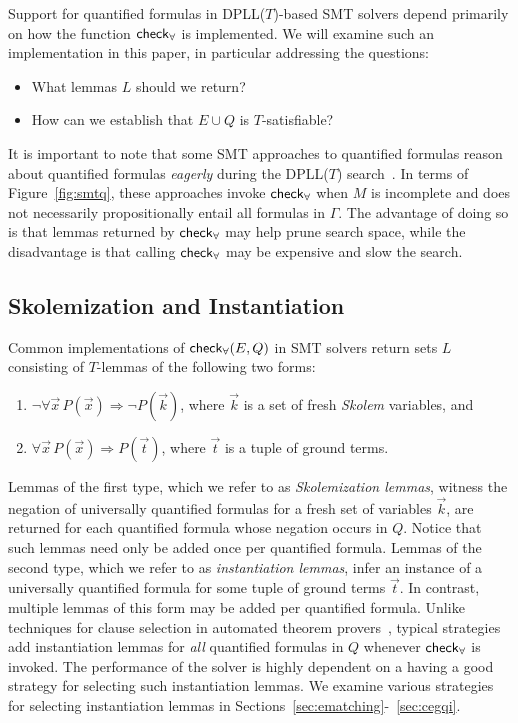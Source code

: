 \documentclass[oribibl]{llncs}
\begin{document}
Support for quantified formulas in DPLL($T$)-based SMT solvers depend primarily on how the function $\small\mathsf{check}_\forall$ is implemented.
We will examine such an implementation in this paper, in particular addressing the questions:
\begin{itemize}
\item What lemmas $L$ should we return?
\item How can we establish that $E \cup Q$ is $T$-satisfiable?
\end{itemize}

It is important to note that some SMT approaches to quantified formulas
reason about quantified formulas \emph{eagerly} during the DPLL($T$) search~\cite{MouraBjoerner07}.
In terms of Figure~\ref{fig:smtq}, these approaches invoke $\small\mathsf{check}_\forall$
when $M$ is incomplete and does not necessarily propositionally entail all formulas in $\Gamma$.
The advantage of doing so is that lemmas returned by $\small\mathsf{check}_\forall$ may help prune search space,
while the disadvantage is that calling $\small\mathsf{check}_\forall$ may be expensive and slow the search.

\subsection{Skolemization and Instantiation}
Common implementations of $\small\mathsf{check}_\forall( E, Q )$ in SMT solvers return sets $L$ consisting of $T$-lemmas of the following two forms:
\begin{enumerate}
\item $\neg \forall \vec x\, P( \vec x ) \Rightarrow \neg P( \vec k )$, where $\vec k$ is a set of fresh \emph{Skolem} variables, and
\item $\forall \vec x\, P( \vec x ) \Rightarrow P( \vec t )$, where $\vec t$ is a tuple of ground terms.
\end{enumerate}
Lemmas of the first type, which we refer to as \emph{Skolemization lemmas},
witness the negation of universally quantified formulas for a fresh set of variables $\vec{k}$,
are returned for each quantified formula whose negation occurs in $Q$.
Notice that such lemmas need only be added once per quantified formula.
Lemmas of the second type, which we refer to as \emph{instantiation lemmas},
infer an instance of a universally quantified formula for some tuple of ground terms $\vec{ t }$.
In contrast, multiple lemmas of this form may be added per quantified formula.
Unlike techniques for clause selection in automated theorem provers~\cite{DBLP:conf/cade/SchulzM16},
typical strategies add instantiation lemmas for \emph{all} quantified formulas in $Q$ whenever $\small\mathsf{check}_\forall$ is invoked.
The performance of the solver is highly dependent on a having a good strategy for selecting such instantiation lemmas.
We examine various strategies for selecting instantiation lemmas in Sections~\ref{sec:ematching}-~\ref{sec:cegqi}.
\end{document}
